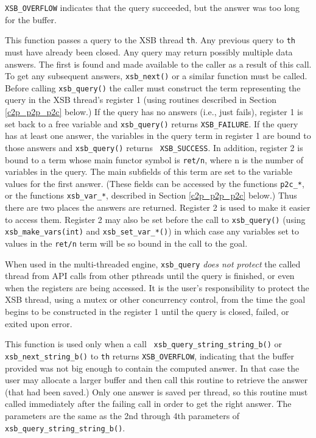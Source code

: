 \begin{description}
\item {\tt XSB\_OVERFLOW} indicates that the query succeeded, but the
  answer was too long for the buffer.
%
\ei

  
%
This function passes a query to the XSB thread {\tt th}.  Any previous
query to {\tt th} must have already been closed.  Any query may return
possibly multiple data answers.  The first is found and made available
to the caller as a result of this call.  To get any subsequent
answers, {\tt xsb\_next()} or a similar function must be called.
Before calling {\tt xsb\_query()} the caller must construct the term
representing the query in the XSB thread's register 1 (using routines
described in Section \ref{c2p_p2p_p2c} below.)  If the query has no
answers (i.e., just fails), register 1 is set back to a free variable
and {\tt xsb\_query()} returns {\tt XSB\_FAILURE}.  If the query has
at least one answer, the variables in the query term in register 1 are
bound to those answers and {\tt xsb\_query()} returns {\tt
  XSB\_SUCCESS}.  In addition, register 2 is bound to a term whose
main functor symbol is {\tt ret/n}, where n is the number of variables
in the query. The main subfields of this term are set to the variable
values for the first answer. (These fields can be accessed by the
functions {\tt p2c\_*}, or the functions {\tt xsb\_var\_*}, described
in Section \ref{c2p_p2p_p2c} below.)  Thus there are two places the
answers are returned. Register 2 is used to make it easier to access
them.  Register 2 may also be set before the call to {\tt xsb\_query()}
(using {\tt xsb\_make\_vars(int)} and {\tt xsb\_set\_var\_*()}) in
which case any variables set to values in the {\tt ret/n} term will be
so bound in the call to the goal.

When used in the multi-threaded engine, {\tt xsb\_query} {\em does not
  protect} the called thread from API calls from other pthreads until
the query is finished, or even when the registers are being accessed.
It is the user's responsibility to protect the XSB thread, using a
mutex or other concurrency control, from the time the goal begins to
be constructed in the register 1 until the query is closed, failed, or
exited upon error.

%
This function is used only when a call {\tt
  xsb\_query\_string\_string\_b()} or {\tt xsb\_next\_string\_b()} to
{\tt th} returns {\tt XSB\_OVERFLOW}, indicating that the buffer
provided was not big enough to contain the computed answer.  In that
case the user may allocate a larger buffer and then call this routine
to retrieve the answer (that had been saved.)  Only one answer is
saved per thread, so this routine must called immediately after the
failing call in order to get the right answer.  The parameters are the
same as the 2nd through 4th parameters of {\tt
  xsb\_query\_string\_string\_b()}.


\end{description}
